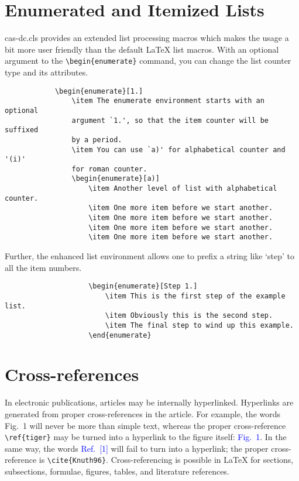 \documentclass[a4paper,fleqn]{cas-dc}
\begin{document}
	
	\section[Enumerated ...]{Enumerated and Itemized Lists}
	{cas-dc.cls} provides an extended list processing macros
	which makes the usage a bit more user friendly than the default
	\LaTeX{} list macros.   With an optional argument to the
	\verb+\begin{enumerate}+ command, you can change the list counter
		type and its attributes.
		
		\begin{verbatim}
			\begin{enumerate}[1.]
				\item The enumerate environment starts with an optional
				argument `1.', so that the item counter will be suffixed
				by a period.
				\item You can use `a)' for alphabetical counter and '(i)' 
				for roman counter.
				\begin{enumerate}[a)]
					\item Another level of list with alphabetical counter.
					\item One more item before we start another.
					\item One more item before we start another.
					\item One more item before we start another.
					\item One more item before we start another.
				\end{verbatim}
				
				Further, the enhanced list environment allows one to prefix a
				string like `step' to all the item numbers.  
				
				\begin{verbatim}
					\begin{enumerate}[Step 1.]
						\item This is the first step of the example list.
						\item Obviously this is the second step.
						\item The final step to wind up this example.
					\end{enumerate}
				\end{verbatim}
				
				\section{Cross-references}
				In electronic publications, articles may be internally
				hyperlinked. Hyperlinks are generated from proper
				cross-references in the article.  For example, the words
				\textcolor{black!80}{Fig.~1} will never be more than simple text,
				whereas the proper cross-reference \verb+\ref{tiger}+ may be
				turned into a hyperlink to the figure itself:
				\textcolor{blue}{Fig.~1}.  In the same way,
				the words \textcolor{blue}{Ref.~[1]} will fail to turn into a
				hyperlink; the proper cross-reference is \verb+\cite{Knuth96}+.
				Cross-referencing is possible in \LaTeX{} for sections,
				subsections, formulae, figures, tables, and literature
				references.
				
\end{document}
